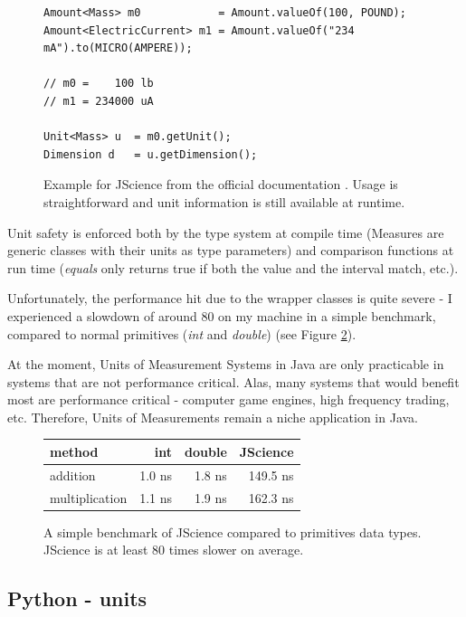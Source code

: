 \documentclass[12pt,oneside,a4paper]{scrbook}
\theoremstyle{definition}
\begin{document}
\begin{figure}
\begin{verbatim}
Amount<Mass> m0            = Amount.valueOf(100, POUND);
Amount<ElectricCurrent> m1 = Amount.valueOf("234 mA").to(MICRO(AMPERE));

// m0 =    100 lb
// m1 = 234000 uA

Unit<Mass> u  = m0.getUnit();
Dimension d   = u.getDimension();

\end{verbatim}
\caption{Example for JScience from the official documentation \citep{Dautelle11}. Usage is straightforward and unit information is still available at runtime.}
\label{code:jscience_example}
\end{figure}

Unit safety is enforced both by the type system at compile time (Measures are generic classes with their units as type parameters) and comparison functions at run time (\emph{equals} only returns true if both the value and the interval match, etc.).

Unfortunately, the performance hit due to the wrapper classes is quite severe - I experienced a slowdown of around 80 on my machine in a simple benchmark, compared to normal primitives (\emph{int} and \emph{double}) (see Figure \ref{bench:jscience}).

At the moment, Units of Measurement Systems in Java are only practicable in systems that are not performance critical. Alas, many systems that would benefit most are performance critical - computer game engines, high frequency trading, etc. Therefore, Units of Measurements remain a niche application in Java.

\begin{figure}
\begin{tabular}{lrrr}
method          & int    & double  & JScience \\
\midrule
addition        & 1.0 ns &  1.8 ns    &   149.5 ns \\
multiplication  & 1.1 ns &  1.9 ns    &   162.3 ns
\end{tabular}
\caption{A simple benchmark of JScience compared to primitives data types. JScience is at least 80 times slower on average.}
\label{bench:jscience}
\end{figure}


\subsection{Python - units}
\end{document}

